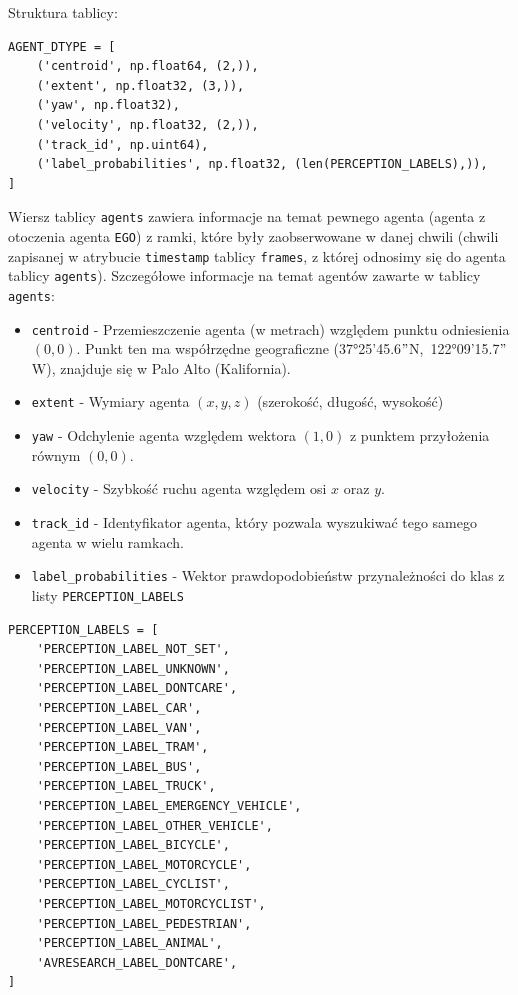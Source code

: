 \noindent
Struktura tablicy:

\begin{verbatim}
AGENT_DTYPE = [
    ('centroid', np.float64, (2,)),
    ('extent', np.float32, (3,)),
    ('yaw', np.float32),
    ('velocity', np.float32, (2,)),
    ('track_id', np.uint64),
    ('label_probabilities', np.float32, (len(PERCEPTION_LABELS),)),
]
\end{verbatim}

\noindent
Wiersz tablicy \texttt{agents} zawiera informacje na temat pewnego agenta (agenta z otoczenia agenta \texttt{EGO}) z ramki, które były zaobserwowane w danej chwili (chwili zapisanej w atrybucie \texttt{timestamp} tablicy \texttt{frames}, z której odnosimy się do agenta tablicy \texttt{agents}). Szczegółowe informacje na temat agentów zawarte w tablicy \texttt{agents}:

\begin{itemize}
    \setlength{\itemsep}{1pt}
    \setlength{\parskip}{0.2em}
    \setlength{\parsep}{0.2em}
    \item \texttt{centroid} - Przemieszczenie agenta (w metrach) względem punktu odniesienia $(0, 0)$. Punkt ten ma współrzędne geograficzne \mbox{(37°25'45.6$"$N, 122°09'15.7$"$W)}, znajduje się w Palo Alto (Kalifornia).
    \item \texttt{extent} - Wymiary agenta $(x,y,z)$ (szerokość, długość, wysokość)
    \item \texttt{yaw} - Odchylenie agenta względem wektora $(1, 0)$ z punktem przyłożenia równym $(0, 0)$.
    \item \texttt{velocity} - Szybkość ruchu agenta względem osi $x$ oraz $y$.
    \item \texttt{track\_id} - Identyfikator agenta, który pozwala wyszukiwać tego samego agenta w wielu ramkach.
    \item \texttt{label\_probabilities} - Wektor prawdopodobieństw przynależności do klas z listy \texttt{PERCEPTION\_LABELS}
\end{itemize}

\begin{verbatim}
PERCEPTION_LABELS = [
    'PERCEPTION_LABEL_NOT_SET',
    'PERCEPTION_LABEL_UNKNOWN',
    'PERCEPTION_LABEL_DONTCARE',
    'PERCEPTION_LABEL_CAR',
    'PERCEPTION_LABEL_VAN',
    'PERCEPTION_LABEL_TRAM',
    'PERCEPTION_LABEL_BUS',
    'PERCEPTION_LABEL_TRUCK',
    'PERCEPTION_LABEL_EMERGENCY_VEHICLE',
    'PERCEPTION_LABEL_OTHER_VEHICLE',
    'PERCEPTION_LABEL_BICYCLE',
    'PERCEPTION_LABEL_MOTORCYCLE',
    'PERCEPTION_LABEL_CYCLIST',
    'PERCEPTION_LABEL_MOTORCYCLIST',
    'PERCEPTION_LABEL_PEDESTRIAN',
    'PERCEPTION_LABEL_ANIMAL',
    'AVRESEARCH_LABEL_DONTCARE',
]
\end{verbatim}

